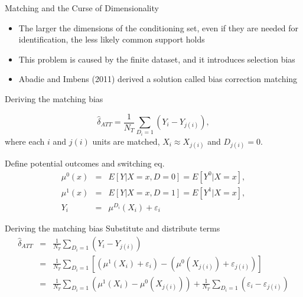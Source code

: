 \documentclass{beamer}
\begin{document}
\begin{frame}{Matching and the Curse of Dimensionality}
	
\begin{itemize}
\item The larger the dimensions of the conditioning set, even if they are needed for identification, the less likely common support holds
\item This problem is caused by the finite dataset, and it introduces selection bias
\item Abadie and Imbens (2011) derived a solution called bias correction matching
\end{itemize}

\end{frame}


\begin{frame}{Deriving the matching bias}
	
  \vspace{-5mm}
  $$
		\widehat{\delta}_{ATT} = \frac{1}{N_T} \sum_{D_i=1} (Y_i - Y_{j(i)}),
  $$
  where each $i$ and $j(i)$ units are matched, $X_i \approx X_{j(i)}$ and $D_{j(i)}=0$. 
	 
  \bigskip
  Define potential outcomes and switching eq.
		\begin{eqnarray*}
      \mu^0(x) &=& E[Y | X=x,D=0] = E[Y^0 | X=x],\\
      \mu^1(x) &=& E[Y | X=x,D=1] = E[Y^1 | X=x],\\
      Y_i &=& \mu^{D_i}(X_i) + \varepsilon_i
		\end{eqnarray*}
\end{frame}

\begin{frame}{Deriving the matching bias}
  Substitute and distribute terms
  \begin{eqnarray*}
    \widehat{\delta}_{ATT} &=& \frac{1}{N_T} \sum_{D_i=1} (Y_i - Y_{j(i)}) \\
    &=& \frac{1}{N_T} \sum_{D_i=1} \left[ (\mu^1(X_i) + \varepsilon_i) - (\mu^0(X_{j(i)}) + \varepsilon_{j(i)}) \right] \\
    &=&  \frac{1}{N_T} \sum_{D_i=1} (\mu^1(X_i) - \mu^0(X_{j(i)})) + \frac{1}{N_T} \sum_{D_i=1}(\varepsilon_i - \varepsilon_{j(i)})
  \end{eqnarray*}
\end{frame}
		
\end{document}
